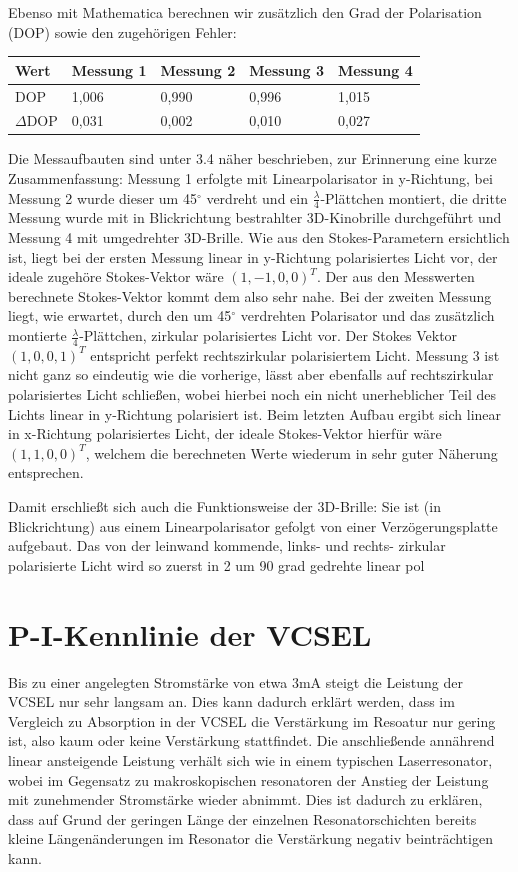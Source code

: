 \documentclass[bigchapter,colorback,accentcolor=tud4b,linedtoc,11pt]{tudreport}
\begin{document}
Ebenso mit Mathematica berechnen wir zusätzlich den Grad der Polarisation (DOP) sowie den zugehörigen Fehler: 

\begin{center}
  \begin{tabular}{|p{3cm}|p{3cm}|p{3cm}|p{3cm}|p{3cm}|}
    \hline
        Wert & Messung 1 & Messung 2 & Messung 3 & Messung 4 \\ \hline
        DOP & 1,006 & 0,990 & 0,996 & 1,015 \\ \hline
        $\Delta$DOP & 0,031 & 0,002 & 0,010 & 0,027 \\ \hline
\end{tabular}
\end{center}

Die Messaufbauten sind unter 3.4 näher beschrieben, zur Erinnerung eine kurze Zusammenfassung: Messung 1 erfolgte mit Linearpolarisator in y-Richtung, bei Messung 2 wurde dieser um 45$^{\circ}$ verdreht und ein $\frac{\lambda}{4}$-Plättchen montiert, die dritte Messung wurde mit in Blickrichtung bestrahlter 3D-Kinobrille durchgeführt und Messung 4 mit umgedrehter 3D-Brille. Wie aus den Stokes-Parametern ersichtlich ist, liegt bei der ersten Messung linear in y-Richtung polarisiertes Licht vor, der ideale zugehöre Stokes-Vektor wäre $(1,-1,0,0)^T$. Der aus den Messwerten berechnete Stokes-Vektor kommt dem also sehr nahe. Bei der zweiten Messung liegt, wie erwartet, durch den um 45$^{\circ}$ verdrehten Polarisator und das zusätzlich montierte $\frac{\lambda}{4}$-Plättchen, zirkular polarisiertes Licht vor. Der Stokes Vektor $(1,0,0,1)^T$ entspricht perfekt rechtszirkular polarisiertem Licht. Messung 3 ist nicht ganz so eindeutig wie die vorherige, lässt aber ebenfalls auf rechtszirkular polarisiertes Licht schließen, wobei hierbei noch ein nicht unerheblicher Teil des Lichts linear in y-Richtung polarisiert ist. Beim letzten Aufbau ergibt sich linear in x-Richtung polarisiertes Licht, der ideale Stokes-Vektor hierfür wäre $(1,1,0,0)^T$, welchem die berechneten Werte wiederum in sehr guter Näherung entsprechen.

Damit erschließt sich auch die Funktionsweise der 3D-Brille:
Sie ist (in Blickrichtung) aus einem Linearpolarisator gefolgt von einer Verzögerungsplatte aufgebaut. Das von der leinwand kommende, links- und rechts- zirkular polarisierte Licht wird so zuerst in 2 um 90 grad gedrehte linear pol

\section{P-I-Kennlinie der VCSEL}
Bis zu einer angelegten Stromstärke von etwa 3mA steigt die Leistung der VCSEL nur sehr langsam an. Dies kann dadurch erklärt werden, dass im Vergleich zu Absorption in der VCSEL die Verstärkung im Resoatur nur gering ist, also kaum oder keine Verstärkung stattfindet. Die anschließende annährend linear ansteigende Leistung verhält sich wie in einem typischen Laserresonator, wobei im Gegensatz zu makroskopischen resonatoren der Anstieg der Leistung mit zunehmender Stromstärke wieder abnimmt. Dies ist dadurch zu erklären, dass auf Grund der geringen Länge der einzelnen Resonatorschichten bereits kleine Längenänderungen im Resonator die Verstärkung negativ beinträchtigen kann.
\end{document}
